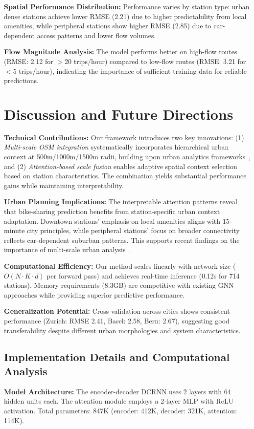 \documentclass[10pt,twocolumn]{article}
\begin{document}
\textbf{Spatial Performance Distribution:} Performance varies by station type: urban dense stations achieve lower RMSE (2.21) due to higher predictability from local amenities, while peripheral stations show higher RMSE (2.85) due to car-dependent access patterns and lower flow volumes.

\textbf{Flow Magnitude Analysis:} The model performs better on high-flow routes (RMSE: 2.12 for $>$20 trips/hour) compared to low-flow routes (RMSE: 3.21 for $<$5 trips/hour), indicating the importance of sufficient training data for reliable predictions.

\section{Discussion and Future Directions}

\textbf{Technical Contributions:} Our framework introduces two key innovations: (1) \textit{Multi-scale OSM integration} systematically incorporates hierarchical urban context at 500m/1000m/1500m radii, building upon urban analytics frameworks~\cite{haklay2010,boeing2017}, and (2) \textit{Attention-based scale fusion} enables adaptive spatial context selection based on station characteristics. The combination yields substantial performance gains while maintaining interpretability.

\textbf{Urban Planning Implications:} The interpretable attention patterns reveal that bike-sharing prediction benefits from station-specific urban context adaptation. Downtown stations' emphasis on local amenities aligns with 15-minute city principles, while peripheral stations' focus on broader connectivity reflects car-dependent suburban patterns. This supports recent findings on the importance of multi-scale urban analysis~\cite{barrington2017}.

\textbf{Computational Efficiency:} Our method scales linearly with network size ($O(N \cdot K \cdot d)$ per forward pass) and achieves real-time inference (0.12s for 714 stations). Memory requirements (8.3GB) are competitive with existing GNN approaches while providing superior predictive performance.

\textbf{Generalization Potential:} Cross-validation across cities shows consistent performance (Zurich: RMSE 2.41, Basel: 2.58, Bern: 2.67), suggesting good transferability despite different urban morphologies and system characteristics.

\subsection{Implementation Details and Computational Analysis}
\textbf{Model Architecture:} The encoder-decoder DCRNN uses 2 layers with 64 hidden units each. The attention module employs a 2-layer MLP with ReLU activation. Total parameters: 847K (encoder: 412K, decoder: 321K, attention: 114K).
\end{document}
